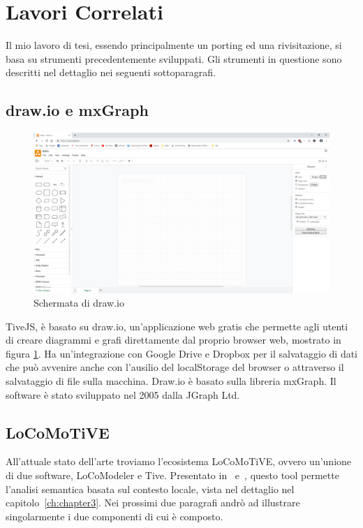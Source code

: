     \section{Lavori Correlati}
        Il mio lavoro di tesi, essendo principalmente un porting ed una rivisitazione, si basa su strumenti precedentemente sviluppati.
        Gli strumenti in questione sono descritti nel dettaglio nei seguenti sottoparagrafi.

        \subsection{draw.io e mxGraph}

        \begin{figure}[htbp]
            \centering
            \includegraphics[scale=0.17]{Figure/drawio.png}
            \caption{Schermata di draw.io}
            \label{fig:drawio}
        \end{figure}

            TiveJS, è basato su draw.io, un'applicazione web gratis che permette agli utenti di creare diagrammi e grafi direttamente dal proprio browser web, mostrato in figura \ref{fig:drawio}. Ha un'integrazione con Google Drive e Dropbox per il salvataggio di dati che può avvenire anche con l'ausilio del localStorage del browser o attraverso il salvataggio di file sulla macchina. Draw.io è basato sulla libreria mxGraph.
            \newline
            Il software è stato sviluppato nel 2005 dalla JGraph Ltd.

        \subsection{LoCoMoTiVE}
            
            All'attuale stato dell'arte troviamo l'ecosistema LoCoMoTiVE, ovvero un'unione di due software, LoCoModeler e Tive. Presentato in~\cite{extending_localcontext} e~\cite{localcontext}, questo tool permette l'analisi semantica basata sul contesto locale, vista nel dettaglio nel capitolo~\ref{ch:chapter3}. Nei prossimi due paragrafi andrò ad illustrare singolarmente i due componenti di cui è composto.

